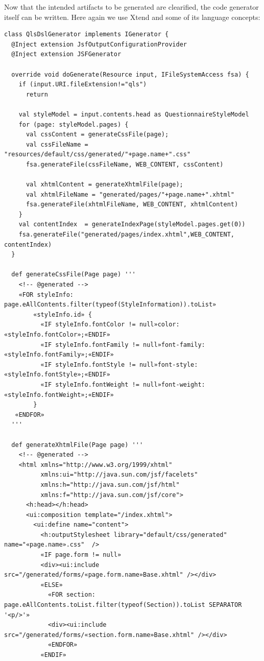 Now that the intended artifacts to be generated are clearified, the code generator
itself can be written. Here again we use Xtend and some of its language concepts:

\begin{lstlisting}[language=Xtend]
class QlsDslGenerator implements IGenerator {
  @Inject extension JsfOutputConfigurationProvider
  @Inject extension JSFGenerator
  
  override void doGenerate(Resource input, IFileSystemAccess fsa) {
    if (input.URI.fileExtension!="qls")
      return
            
    val styleModel = input.contents.head as QuestionnaireStyleModel
    for (page: styleModel.pages) {
      val cssContent = generateCssFile(page);
   	  val cssFileName = "resources/default/css/generated/"+page.name+".css"
   	  fsa.generateFile(cssFileName, WEB_CONTENT, cssContent)
   	
   	  val xhtmlContent = generateXhtmlFile(page);
   	  val xhtmlFileName = "generated/pages/"+page.name+".xhtml"
   	  fsa.generateFile(xhtmlFileName, WEB_CONTENT, xhtmlContent)
    }
    val contentIndex  = generateIndexPage(styleModel.pages.get(0))
    fsa.generateFile("generated/pages/index.xhtml",WEB_CONTENT, contentIndex)
  }

  def generateCssFile(Page page) '''
  	<!-- @generated -->
    «FOR styleInfo: page.eAllContents.filter(typeof(StyleInformation)).toList»
		«styleInfo.id» {
		  «IF styleInfo.fontColor != null»color: «styleInfo.fontColor»;«ENDIF»
		  «IF styleInfo.fontFamily != null»font-family: «styleInfo.fontFamily»;«ENDIF»
		  «IF styleInfo.fontStyle != null»font-style: «styleInfo.fontStyle»;«ENDIF»
		  «IF styleInfo.fontWeight != null»font-weight: «styleInfo.fontWeight»;«ENDIF»
		}
   «ENDFOR»
  '''
	
  def generateXhtmlFile(Page page) '''
	<!-- @generated -->
	<html xmlns="http://www.w3.org/1999/xhtml"
	      xmlns:ui="http://java.sun.com/jsf/facelets"
	      xmlns:h="http://java.sun.com/jsf/html"
	      xmlns:f="http://java.sun.com/jsf/core">
	  <h:head></h:head>
	  <ui:composition template="/index.xhtml">
	    <ui:define name="content">
	      <h:outputStylesheet library="default/css/generated" name="«page.name».css"  />
	      «IF page.form != null»
	      <div><ui:include src="/generated/forms/«page.form.name»Base.xhtml" /></div>
	      «ELSE»
	        «FOR section: page.eAllContents.toList.filter(typeof(Section)).toList SEPARATOR '<p/>'»
	        <div><ui:include src="/generated/forms/«section.form.name»Base.xhtml" /></div>
	        «ENDFOR»
	      «ENDIF»
	  

\end{lstlisting}
